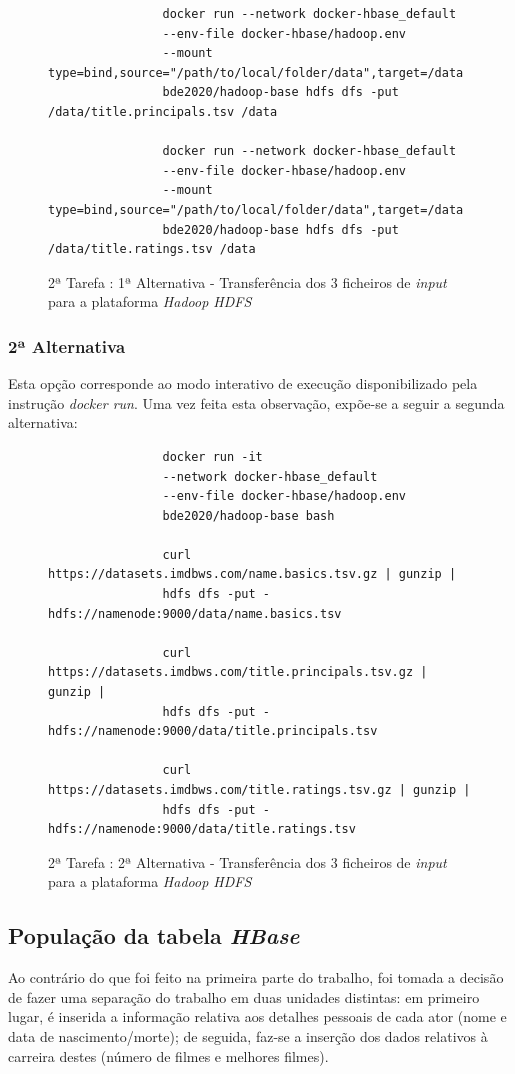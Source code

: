 \documentclass[a4paper]{report}
\begin{document}
{\begin{figure}[H]
{\begin{verbatim}
				docker run --network docker-hbase_default
				--env-file docker-hbase/hadoop.env
				--mount type=bind,source="/path/to/local/folder/data",target=/data
				bde2020/hadoop-base hdfs dfs -put /data/title.principals.tsv /data
				
				docker run --network docker-hbase_default
				--env-file docker-hbase/hadoop.env
				--mount type=bind,source="/path/to/local/folder/data",target=/data
				bde2020/hadoop-base hdfs dfs -put /data/title.ratings.tsv /data
				\end{verbatim}
			}
			\caption{2ª Tarefa : 1ª Alternativa - Transferência dos 3 ficheiros de \textit{input} para a plataforma \textit{Hadoop HDFS}}
			\label{fig:16}
		\end{figure}
		
		\subsubsection{2ª Alternativa}
		Esta opção corresponde ao modo interativo de execução disponibilizado pela instrução \textit{docker run}.
		Uma vez feita esta observação, expõe-se a seguir a segunda alternativa:
		\begin{figure}[H]
			{
				\color{teal}
				\begin{verbatim}
				docker run -it
				--network docker-hbase_default
				--env-file docker-hbase/hadoop.env
				bde2020/hadoop-base bash
				
				curl https://datasets.imdbws.com/name.basics.tsv.gz | gunzip |
				hdfs dfs -put - hdfs://namenode:9000/data/name.basics.tsv
				
				curl https://datasets.imdbws.com/title.principals.tsv.gz | gunzip |
				hdfs dfs -put - hdfs://namenode:9000/data/title.principals.tsv
				
				curl https://datasets.imdbws.com/title.ratings.tsv.gz | gunzip |
				hdfs dfs -put - hdfs://namenode:9000/data/title.ratings.tsv
				\end{verbatim}
			}
			\caption{2ª Tarefa : 2ª Alternativa - Transferência dos 3 ficheiros de \textit{input} para a plataforma \textit{Hadoop HDFS}}
			\label{fig:17}
		\end{figure}
		
		\subsection{População da tabela \textit{HBase}} \label{subsec:Task2-3}
		Ao contrário do que foi feito na primeira parte do trabalho, foi tomada a decisão de fazer uma separação do trabalho em duas unidades distintas: em primeiro lugar, é inserida a informação relativa aos detalhes pessoais de cada ator (nome e data de nascimento/morte); de seguida, faz-se a inserção dos dados relativos à carreira destes (número de filmes e melhores filmes).
}
\end{document}
